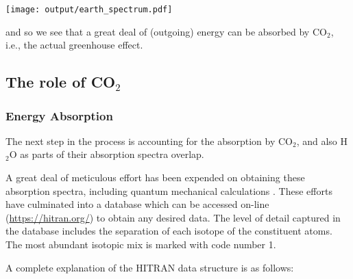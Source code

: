 \documentclass[10pt,a4paper,titlepage]{article}
\begin{document}
\texttt{[image: output/earth\_spectrum.pdf]}

and so we see that a great deal of (outgoing) energy can be absorbed
by CO$_{\text{2}}$, i.e., the actual greenhouse effect.

\subsection{The role of CO$_{\text{2}}$}
\label{sec-3-4}
\subsubsection{Energy Absorption}
\label{sec-3-4-1}

The next step in the process is accounting for the absorption by
CO$_{\text{2}}$, and also H$_{\text{2}}$O as parts of their absorption spectra overlap.

A great deal of meticulous effort has been expended on obtaining these
absorption spectra, including quantum mechanical calculations
\citep{rothman-al2009:hitran,lamouroux-al12:database,etminan-al16:forcing,mlynczak-al16:spectroscopic}.
These efforts have culminated into a database which can be accessed
on-line (\url{https://hitran.org/}) to obtain any desired data.  The level
of detail captured in the database includes the separation of each
isotope of the constituent atoms. The most abundant isotopic mix is
marked with code number 1.

A complete explanation of the  HITRAN data structure is as follows:
\end{document}
